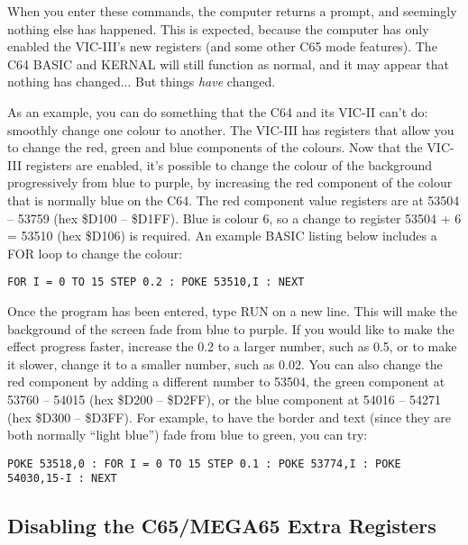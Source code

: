 When you enter these commands, the computer returns a  prompt, and seemingly nothing else has
happened.  This is expected, because the computer has only enabled the VIC-III's new registers (and some other
C65 mode features). The C64 BASIC and KERNAL will still function as normal, and it may appear
that nothing has changed... But things \textit{have} changed.

As an example, you can do something that the C64 and its VIC-II can't do: smoothly change one colour to another.
The VIC-III has registers that allow you to change the red, green and blue components of the colours. Now that the VIC-III
registers are enabled, it's possible to change the colour of the background progressively from blue to purple, by increasing
the red component of the colour that is normally blue on the C64.  The red component value registers are at
53504 -- 53759 (hex \$D100 -- \$D1FF). Blue is colour 6, so a change to register 53504 + 6 = 53510 (hex \$D106) is required.
An example BASIC listing below includes a FOR loop to change the colour:

\begin{tcolorbox}[colback=black,coltext=white]
\verbatimfont{\codefont}
\begin{verbatim}
FOR I = 0 TO 15 STEP 0.2 : POKE 53510,I : NEXT
\end{verbatim}
\end{tcolorbox}

Once the program has been entered, type RUN on a new line. This will make the background of the screen fade from
blue to purple.  If you would like to make the effect progress faster, increase the 0.2 to a larger number, such as 0.5, or to
make it slower, change it to a smaller number, such as 0.02. You can also change the red component by adding a
different number to 53504, the green component at 53760 -- 54015 (hex \$D200 -- \$D2FF), or the
blue component at 54016 -- 54271 (hex \$D300 -- \$D3FF).  For example, to have
the border and text (since they are both normally ``light blue'') fade from blue to green, you can try:

\begin{tcolorbox}[colback=black,coltext=white]
\verbatimfont{\codefont}
\begin{verbatim}
POKE 53518,0 : FOR I = 0 TO 15 STEP 0.1 : POKE 53774,I : POKE 54030,15-I : NEXT
\end{verbatim}
\end{tcolorbox}

\subsection{Disabling the C65/MEGA65 Extra Registers}

